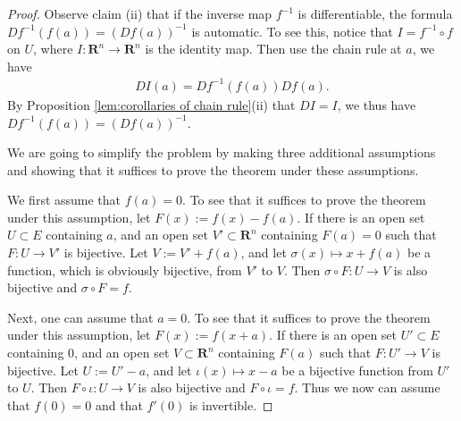 \begin{proof}
\begin{comment}
    We first observe that if the inverse map $f^{-1}$ is differentiable, the formula $Df^{-1}(f(a)) = (Df(a))^{-1}$ is automatic. To see this, notice that $I = f^{-1} \circ f$ on $U$, where $I : \mathbf{R}^n \to \mathbf{R}^m$ is the identity and linear map. Then use the chain rule at $a$, we have
        \begin{align*}
            DI(a) = Df^{-1}(f(a))Df(a).
        \end{align*}
    By Proposition \ref{lem:corollaries of chain rule}(ii) that $DI = I$, we thus have $Df^{-1}(f(a)) = (Df(a))^{-1}$.
\end{comment}

    Observe claim (ii) that if the inverse map $f^{-1}$ is differentiable, the formula $Df^{-1}(f(a)) = (Df(a))^{-1}$ is automatic. To see this, notice that $I = f^{-1} \circ f$ on $U$, where $I : \mathbf{R}^n \to \mathbf{R}^n$ is the identity map. Then use the chain rule at $a$, we have
        \begin{align*}
            DI(a) = Df^{-1}(f(a))Df(a).
        \end{align*}
    By Proposition \ref{lem:corollaries of chain rule}(ii) that $DI = I$, we thus have $Df^{-1}(f(a)) = (Df(a))^{-1}$.

    We are going to simplify the problem by making three additional assumptions and showing that it suffices to prove the theorem under these assumptions.

    We first assume that $f(a) = 0$. To see that it suffices to prove the theorem under this assumption, let $F(x) := f(x) - f(a)$. If there is an open set $U \subset E$ containing $a$, and an open set $V' \subset \mathbf{R}^n$ containing $F(a) = 0$ such that $F : U \to V'$ is bijective. Let $V := V' + f(a)$, and let $\sigma(x) \mapsto x + f(a)$ be a function, which is obviously bijective, from $V'$ to $V$. Then $\sigma\circ F : U \to V$ is also bijective and $\sigma \circ F = f$.

    Next, one can assume that $a = 0$. To see that it suffices to prove the theorem under this assumption, let $F(x) := f(x + a)$. If there is an open set $U' \subset E$ containing $0$, and an open set $V \subset \mathbf{R}^n$ containing $F(a)$ such that $F : U' \to V$ is bijective. Let $U := U' - a$, and let $\iota(x) \mapsto x - a$ be a bijective function from $U'$ to $U$. Then $F \circ \iota : U \to V$ is also bijective and $F \circ \iota = f$. Thus we now can assume that $f(0) = 0$ and that $f'(0)$ is invertible.


\end{proof}
